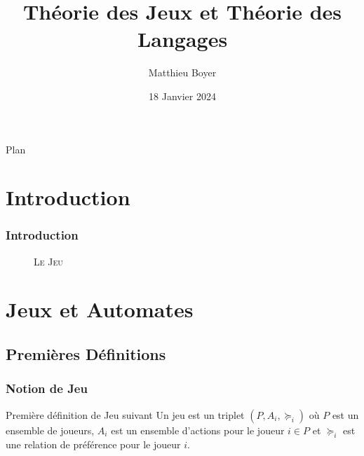 \documentclass{beamercours}
\title{Théorie des Jeux et Théorie des Langages}
\author{Matthieu Boyer}
\date{18 Janvier 2024}
\begin{document}
\maketitle
\begin{frame}{Plan}\tableofcontents\end{frame}

\section{Introduction}
\begin{frame}
    \frametitle{Introduction}
    \begin{figure}[h]
        \centering
        \caption{\textsc{Le Jeu}}
        \label{fig:dfa:lejeu}
    \end{figure}
    

\end{frame}

\section{Jeux et Automates}
\subsection{Premières Définitions}
\begin{frame}
\frametitle{Notion de Jeu}
\begin{définition}{Première définition de Jeu suivant \cite{game-rep-automata}}{}
Un jeu est un triplet $\left(P, A_{i}, \succeq_{i}\right)$ où $P$ est un ensemble de joueurs, $A_{i}$ est un ensemble d'actions pour le joueur $i \in P$ et $\succeq_{i}$ est une relation de préférence pour le joueur $i$.
\end{définition}
\end{frame}
\end{document}
